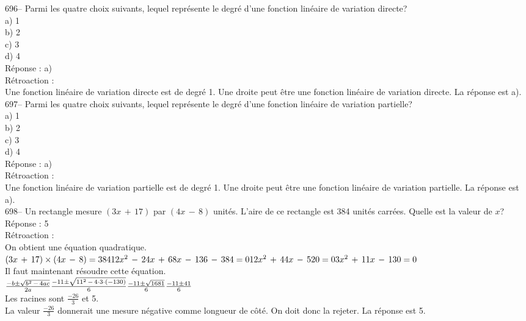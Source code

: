 ﻿\documentclass[letterpaper, 12pt]{article}
\begin{document}
696-- Parmi les quatre choix suivants, lequel repr\'esente le degr\'e d'une
fonction lin\'eaire de variation directe?\\
a) 1\\
b) 2\\
c) 3\\
d) 4\\

R\'eponse : a)\\

R\'etroaction : \\
Une fonction lin\'eaire de variation directe est de degr\'e 1.  Une droite
peut \^etre une fonction lin\'eaire de variation directe.  La r\'eponse est
a).\\

697-- Parmi les quatre choix suivants, lequel repr\'esente le degr\'e d'une
fonction lin\'eaire de variation partielle?\\
a) 1\\
b) 2\\
c) 3\\
d) 4\\

R\'eponse : a)\\

R\'etroaction : \\
Une fonction lin\'eaire de variation partielle est de degr\'e 1.  Une droite
peut \^etre une fonction lin\'eaire de variation partielle.  La r\'eponse
est a).\\

698-- Un rectangle mesure $(3x\,+\,17)$ par $(4x\,-\,8)$ unit\'es.  L'aire
de ce rectangle est 384 unit\'es carr\'ees.  Quelle est la valeur de $x$?\\

R\'eponse : 5\\

R\'etroaction : \\
On obtient une \'equation quadratique.  \\
$(3x\,+\,17)\times(4x\,-\,8)=384\\
12x^{2}\,-\,24x\,+\,68x\,-\,136\,-\,384=0\\
12x^{2}\,+\,44x\,-\,520=0\\
3x^{2}\,+\,11x\,-\,130=0$\\
Il faut maintenant r\'esoudre cette \'equation.\\[2mm]
$\frac{-b\pm\sqrt{b^{2}\,-\,4ac}}{2a}\\[2mm]
\frac{-11\pm \sqrt{11^{2}\,-\,4\cdot3\cdot(-130)}}{6}\\[2mm]
\frac{-11\pm \sqrt{1681}}{6}\\[2mm]
\frac{-11\pm 41}{6}$\\[2mm]
Les racines sont $\frac{-26}{3}$ et 5.\\[2mm]
La valeur $\frac{-26}{3}$ donnerait une mesure n\'egative comme longueur de
c\^ot\'e. On doit donc la rejeter.  La r\'eponse est 5.\\
\end{document}
